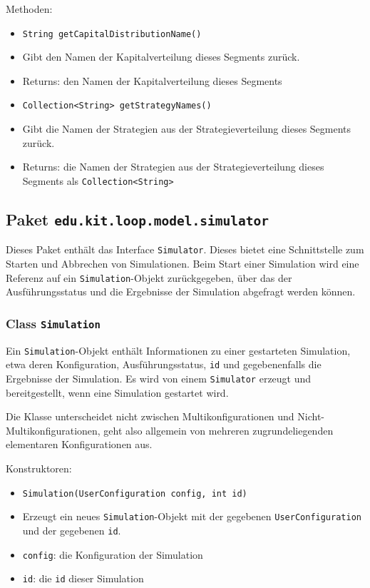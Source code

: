 \documentclass[parskip=full,11pt]{scrartcl}
\begin{document}
Methoden:
\begin{itemize}\itemsep -10pt
\item \texttt{String getCapitalDistributionName()}
\item[] Gibt den Namen der Kapitalverteilung dieses Segments zurück.
\item[] Returns: den Namen der Kapitalverteilung dieses Segments

\item \texttt{Collection<String> getStrategyNames()}
\item[] Gibt die Namen der Strategien aus der Strategieverteilung dieses Segments zurück.
\item[] Returns: die Namen der Strategien aus der Strategieverteilung dieses Segments als \texttt{Collection<String>}
\end{itemize}


\subsection{Paket \texttt{edu.kit.loop.model.simulator}}
Dieses Paket enthält das Interface \texttt{Simulator}. Dieses bietet eine Schnittstelle zum Starten und Abbrechen von Simulationen. Beim Start einer Simulation wird eine Referenz auf ein \texttt{Simulation}-Objekt zurückgegeben, über das der Ausführungsstatus und die Ergebnisse der Simulation abgefragt werden können.

\subsubsection{Class \texttt{Simulation}}
Ein \texttt{Simulation}-Objekt enthält Informationen zu einer gestarteten Simulation, etwa deren Konfiguration, Ausführungsstatus, \texttt{id} und gegebenenfalls die Ergebnisse der Simulation. Es wird von einem \texttt{Simulator} erzeugt und bereitgestellt, wenn eine Simulation gestartet wird.

Die Klasse unterscheidet nicht zwischen Multikonfigurationen und Nicht-Multikonfigurationen, geht also allgemein von mehreren zugrundeliegenden elementaren Konfigurationen aus.

Konstruktoren:
\begin{itemize} \itemsep -10pt
\item \texttt{Simulation(UserConfiguration config, int id)}
\item[] Erzeugt ein neues \texttt{Simulation}-Objekt mit der gegebenen \texttt{UserConfiguration} und der gegebenen \texttt{id}.
\item[] \texttt{config}: die Konfiguration der Simulation
\item[] \texttt{id}: die \texttt{id} dieser Simulation
\end{itemize}
\end{document}
